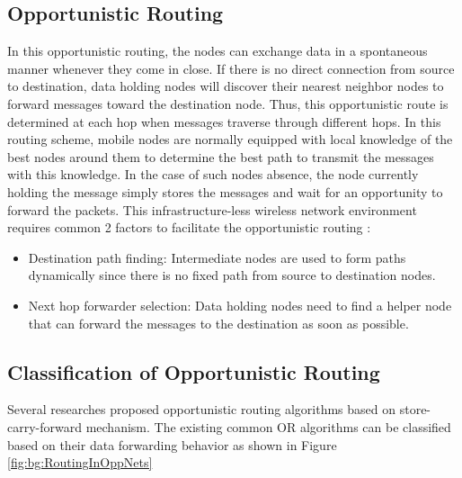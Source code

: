 \subsection{Opportunistic Routing}
\label{bg:Opportunistic Networks:Opportunistic Routing}
In this opportunistic routing, the nodes can exchange data in a spontaneous manner whenever they come in close.
If there is no direct connection from source to destination, data holding nodes will discover their nearest neighbor nodes to forward messages toward the destination node.
Thus, this opportunistic route is determined at each hop when messages traverse through different hops.
In this routing scheme, mobile nodes are normally equipped with local knowledge of the best nodes around them to determine the best path to transmit the messages with this knowledge.
In the case of such nodes absence, the node currently holding the message simply stores the messages and wait for an opportunity to forward the packets.
This  infrastructure-less wireless network environment requires common 2 factors to facilitate the opportunistic routing \cite{Poonguzharselvi2013a} : 
\begin{itemize}
	\item Destination path finding:
	Intermediate nodes are used to form paths dynamically since there is no fixed path from source to destination nodes.
	\item Next hop forwarder selection:
	Data holding nodes need to find a helper node that can forward the messages to the destination as soon as possible.
\end{itemize}


\subsection{Classification of Opportunistic Routing}
\label{bg:Opportunistic Networks:Classification of Opportunistic Routing}

Several researches proposed opportunistic routing algorithms based on store-carry-forward mechanism.
The existing common OR algorithms can be classified based on their data forwarding behavior as shown in Figure \ref{fig:bg:RoutingInOppNets} 

